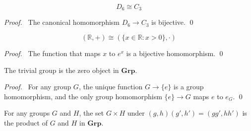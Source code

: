 \begin{cor}
    \[ D_6 \cong C_3 \]
\end{cor}

\begin{proof}
    \pf\ The canonical homomorphism $D_6 \rightarrow C_3$ is bijective. \qed
\end{proof}

\begin{cor}
    \[ (\mathbb{R}, +) \cong (\{ x \in \mathbb{R} : x > 0 \}, \cdot) \]
\end{cor}

\begin{proof}
    \pf\ The function that maps $x$ to $e^x$ is a bijective homomorphism. \qed
\end{proof}

\begin{prop}
    The trivial group is the zero object in $\mathbf{Grp}$.
\end{prop}

\begin{proof}
    \pf\ For any group $G$, the unique function $G \rightarrow \{e\}$ is a group homomorphism, and the only group homomorphism $\{e\} \rightarrow G$ maps $e$ to $e_G$. \qed
\end{proof}

\begin{prop}
    For any groups $G$ and $H$, the set $G \times H$ under $(g,h)(g',h') = (gg',hh')$ is the product of $G$ and $H$ in $\mathbf{Grp}$.
\end{prop}

